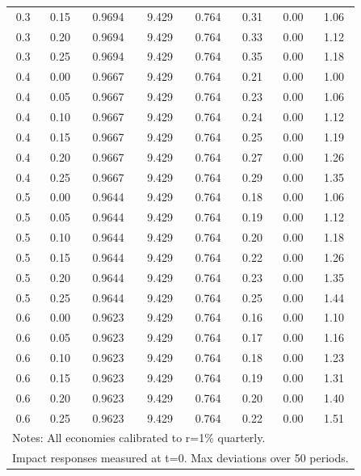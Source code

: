 \begin{table}[htbp]
\begin{tabular}{cccccccc}
0.3 & 0.15 & 0.9694 & 9.429 & 0.764 & 0.31 & 0.00 & 1.06 \\
0.3 & 0.20 & 0.9694 & 9.429 & 0.764 & 0.33 & 0.00 & 1.12 \\
0.3 & 0.25 & 0.9694 & 9.429 & 0.764 & 0.35 & 0.00 & 1.18 \\
0.4 & 0.00 & 0.9667 & 9.429 & 0.764 & 0.21 & 0.00 & 1.00 \\
0.4 & 0.05 & 0.9667 & 9.429 & 0.764 & 0.23 & 0.00 & 1.06 \\
0.4 & 0.10 & 0.9667 & 9.429 & 0.764 & 0.24 & 0.00 & 1.12 \\
0.4 & 0.15 & 0.9667 & 9.429 & 0.764 & 0.25 & 0.00 & 1.19 \\
0.4 & 0.20 & 0.9667 & 9.429 & 0.764 & 0.27 & 0.00 & 1.26 \\
0.4 & 0.25 & 0.9667 & 9.429 & 0.764 & 0.29 & 0.00 & 1.35 \\
0.5 & 0.00 & 0.9644 & 9.429 & 0.764 & 0.18 & 0.00 & 1.06 \\
0.5 & 0.05 & 0.9644 & 9.429 & 0.764 & 0.19 & 0.00 & 1.12 \\
0.5 & 0.10 & 0.9644 & 9.429 & 0.764 & 0.20 & 0.00 & 1.18 \\
0.5 & 0.15 & 0.9644 & 9.429 & 0.764 & 0.22 & 0.00 & 1.26 \\
0.5 & 0.20 & 0.9644 & 9.429 & 0.764 & 0.23 & 0.00 & 1.35 \\
0.5 & 0.25 & 0.9644 & 9.429 & 0.764 & 0.25 & 0.00 & 1.44 \\
0.6 & 0.00 & 0.9623 & 9.429 & 0.764 & 0.16 & 0.00 & 1.10 \\
0.6 & 0.05 & 0.9623 & 9.429 & 0.764 & 0.17 & 0.00 & 1.16 \\
0.6 & 0.10 & 0.9623 & 9.429 & 0.764 & 0.18 & 0.00 & 1.23 \\
0.6 & 0.15 & 0.9623 & 9.429 & 0.764 & 0.19 & 0.00 & 1.31 \\
0.6 & 0.20 & 0.9623 & 9.429 & 0.764 & 0.20 & 0.00 & 1.40 \\
0.6 & 0.25 & 0.9623 & 9.429 & 0.764 & 0.22 & 0.00 & 1.51 \\
\hline
\multicolumn{8}{l}{\footnotesize Notes: All economies calibrated to r=1\% quarterly.} \\
\multicolumn{8}{l}{\footnotesize Impact responses measured at t=0. Max deviations over 50 periods.} \\
\end{tabular}
\end{table}
